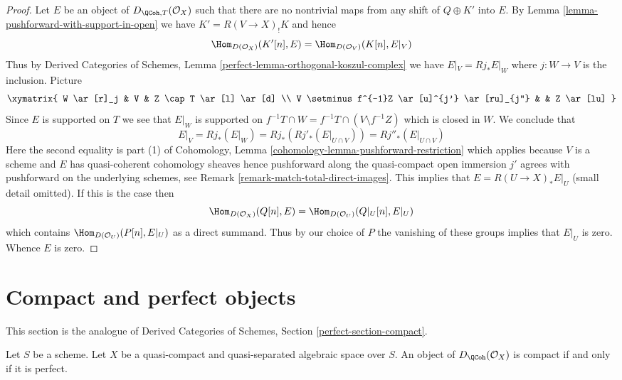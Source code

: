 \begin{proof}
\medskip\noindent
Let $E$ be an object of $D_{\QCoh, T}(\mathcal{O}_X)$ such that
there are no nontrivial maps from any shift of $Q \oplus K'$ into $E$.
By Lemma \ref{lemma-pushforward-with-support-in-open}
we have $K' =  R(V \to X)_! K$ and hence
$$
\Hom_{D(\mathcal{O}_X)}(K'[n], E) = \Hom_{D(\mathcal{O}_V)}(K[n], E|_V)
$$
Thus by
Derived Categories of Schemes,
Lemma \ref{perfect-lemma-orthogonal-koszul-complex} we have
$E|_V = Rj_*E|_W$ where $j : W \to V$ is the inclusion. Picture
$$
\xymatrix{
W \ar[r]_j & V & Z \cap T \ar[l] \ar[d] \\
V \setminus f^{-1}Z \ar[u]^{j'} \ar[ru]_{j''} & & Z \ar[lu]
}
$$
Since $E$ is supported on $T$ we see that $E|_W$ is supported on
$f^{-1}T \cap W = f^{-1}T \cap (V \setminus f^{-1}Z)$
which is closed in $W$. We conclude that
$$
E|_V = Rj_*(E|_W) = Rj_*(Rj'_*(E|_{U \cap V})) = Rj''_*(E|_{U \cap V})
$$
Here the second equality is part (1) of
Cohomology, Lemma \ref{cohomology-lemma-pushforward-restriction}
which applies because $V$ is a scheme and $E$ has quasi-coherent
cohomology sheaves hence pushforward along the quasi-compact
open immersion $j'$ agrees with pushforward on the underlying schemes, see
Remark \ref{remark-match-total-direct-images}.
This implies that $E = R(U \to X)_*E|_U$ (small detail omitted). If
this is the case then
$$
\Hom_{D(\mathcal{O}_X)}(Q[n], E) = \Hom_{D(\mathcal{O}_U)}(Q|_U[n], E|_U)
$$
which contains $\Hom_{D(\mathcal{O}_U)}(P[n], E|_U)$ as a direct summand.
Thus by our choice of $P$ the vanishing of these groups implies that $E|_U$
is zero. Whence $E$ is zero.
\end{proof}










\section{Compact and perfect objects}
\label{section-compact}

\noindent
This section is the analogue of
Derived Categories of Schemes, Section \ref{perfect-section-compact}.

\begin{proposition}
\label{proposition-compact-is-perfect}
Let $S$ be a scheme.
Let $X$ be a quasi-compact and quasi-separated algebraic space over $S$.
An object of $D_\QCoh(\mathcal{O}_X)$ is compact
if and only if it is perfect.
\end{proposition}

